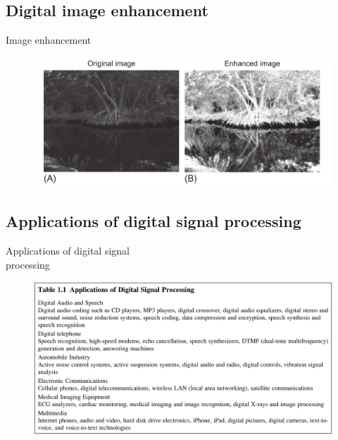 \documentclass[pdflatex,compress,mathserif]{beamer}
\begin{document}
\subsection{Digital image enhancement}

\begin{frame}{Image enhancement}
	\begin{figure}
		\includegraphics[width=\linewidth]{img/img14}
	\end{figure}
\end{frame}

\subsection{Applications of digital signal processing}

\begin{frame}{Applications of digital signal\\processing}
	\begin{figure}
		\includegraphics[width=\linewidth]{img/img15}
	\end{figure}
\end{frame}
\end{document}
